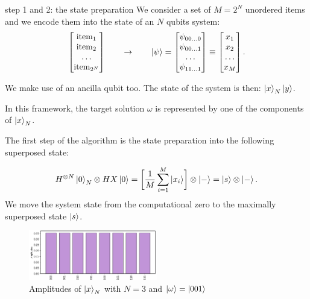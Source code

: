 \documentclass[aspectratio=169, 8pt, xcolor={svgnames}, hyperref={linkcolor=black}]{beamer}
\begin{document}
\begin{frame}{step 1 and 2: the state preparation}
We consider a set of $M=2^{N}$ unordered items and we encode them into the state of 
an $N$ qubits system: 
$$ 
\begin{bmatrix}
\text{item}_1 \\
\text{item}_2 \\
\dots \\
\text{item}_{2^N}
\end{bmatrix} \qquad \to \qquad 
\ket{\psi} = \begin{bmatrix}
\psi_{00 \dots 0} \\
\psi_{00 \dots 1}  \\
\dots \\
\psi_{11 \dots 1}
\end{bmatrix}  
\equiv 
\begin{bmatrix}
x_1 \\
x_2  \\
\dots \\
x_M
\end{bmatrix} . 
$$
\pause 

We make use of an ancilla qubit too. The state of the system is then: $\ket{x}_N \ket{y}$. \pause

In this framework, the target solution $\omega$ is represented by one of the components of $\ket{x}_N$. \pause

The first step of the algorithm is the state preparation into the following superposed state:
\begin{multicols}{2}
$$ H^{\otimes N} \ket{0}_N \otimes HX \ket{0} = \biggl[ \frac{1}{M}\sum_{i=1}^{M} \ket{x_i} \biggr] \otimes \ket{-} = \ket{s}\otimes \ket{-}. $$
\textcolor{carnelian}{We move the system state from the computational zero
to the maximally superposed state $\ket{s}$.}

\begin{figure}
   \includegraphics[width=0.5\textwidth]{figures/state1.png}
   \caption*{Amplitudes of $\ket{x}_N$ with $N=3$ and $\ket{\omega} = \ket{001}$}
\end{figure}
\end{multicols}

\end{frame}
\end{document}
